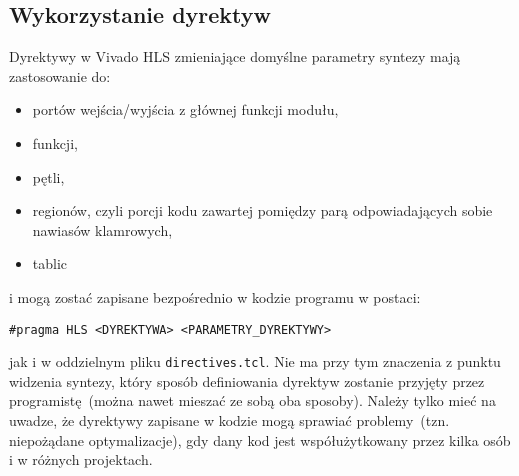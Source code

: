 \subsection{Wykorzystanie dyrektyw}
Dyrektywy w Vivado HLS zmieniające domyślne parametry syntezy mają zastosowanie do:
\begin{itemize}
\item portów wejścia/wyjścia z głównej funkcji modułu,
\item funkcji,
\item pętli,
\item regionów, czyli porcji kodu zawartej pomiędzy parą odpowiadających sobie nawiasów klamrowych,
\item tablic
\end{itemize}
i mogą zostać zapisane bezpośrednio w kodzie programu w postaci:
\begin{lstlisting}
#pragma HLS <DYREKTYWA> <PARAMETRY_DYREKTYWY>
\end{lstlisting}
jak i w oddzielnym pliku \texttt{directives.tcl}. Nie ma przy tym znaczenia z punktu widzenia syntezy, który sposób definiowania dyrektyw zostanie przyjęty przez programistę~(można nawet mieszać ze sobą oba sposoby). Należy tylko mieć na uwadze, że dyrektywy zapisane w kodzie mogą sprawiać problemy~(tzn. niepożądane optymalizacje), gdy dany kod jest współużytkowany przez kilka osób i w różnych projektach.

